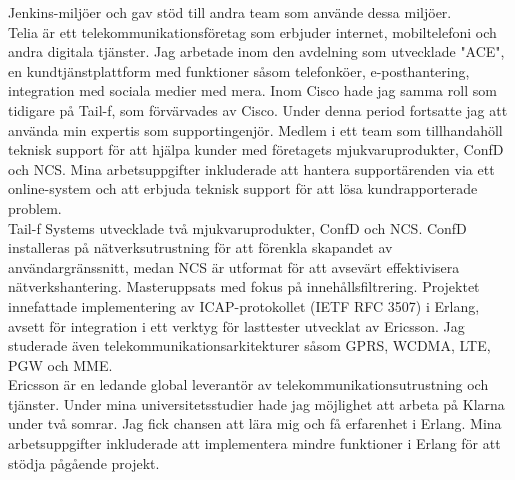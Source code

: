 \documentclass[purpleprocv]{procv}
\begin{document}
\begin{procv-twocolumns}
{{          Jenkins-miljöer och gav stöd till andra team som använde dessa miljöer.
          \\[3pt]
          Telia är ett telekommunikationsföretag som erbjuder internet, mobiltelefoni och 
          andra digitala tjänster. Jag arbetade inom den avdelning som utvecklade "ACE", 
          en kundtjänstplattform med funktioner såsom telefonköer, e-posthantering, 
          integration med sociala medier med mera.}
          {Inom Cisco hade jag samma roll som tidigare på Tail-f, som förvärvades av Cisco. 
          Under denna period fortsatte jag att använda min expertis som supportingenjör.}
          {Medlem i ett team som tillhandahöll teknisk support för att hjälpa kunder med företagets 
          mjukvaruprodukter, ConfD och NCS. Mina arbetsuppgifter inkluderade att hantera 
          supportärenden via ett online-system och att erbjuda teknisk support för 
          att lösa kundrapporterade problem.
          \\[3pt]
          Tail-f Systems utvecklade två mjukvaruprodukter, ConfD och NCS. ConfD installeras 
          på nätverksutrustning för att förenkla skapandet av användargränssnitt, medan NCS är 
          utformat för att avsevärt effektivisera nätverkshantering.}
          {Masteruppsats med fokus på innehållsfiltrering. Projektet innefattade implementering 
          av ICAP-protokollet (IETF RFC 3507) i Erlang, avsett för integration i ett 
          verktyg för lasttester utvecklat av Ericsson. Jag studerade även 
          telekommunikationsarkitekturer såsom GPRS, WCDMA, LTE, PGW och MME.
          \\[3pt]
          Ericsson är en ledande global leverantör av telekommunikationsutrustning och tjänster.}
          {Under mina universitetsstudier hade jag möjlighet att arbeta på Klarna under två 
          somrar. Jag fick chansen att lära mig och få erfarenhet i Erlang. Mina 
          arbetsuppgifter inkluderade att implementera mindre funktioner i Erlang för att 
          stödja pågående projekt. 
          \\[3pt]
}}
\end{procv-twocolumns}
\end{document}
